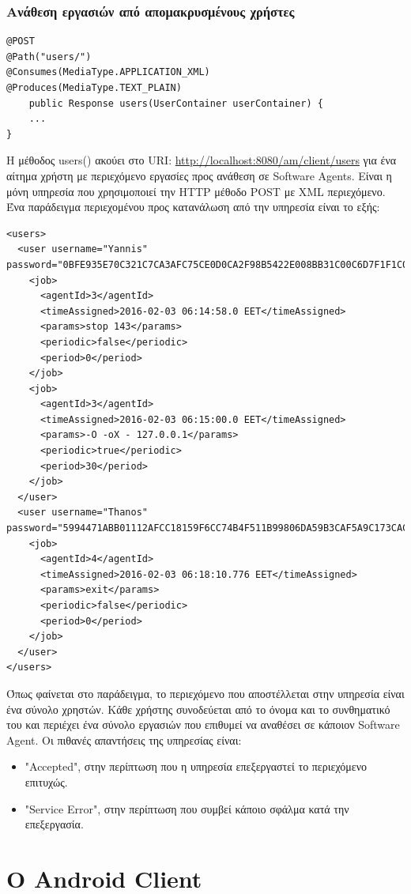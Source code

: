 \documentclass[a4paper,11pt]{article}
\begin{document}
\begin{sloppypar}
\subsubsection{Ανάθεση εργασιών από απομακρυσμένους χρήστες}
\begin{lstlisting}
@POST
@Path("users/")
@Consumes(MediaType.APPLICATION_XML)
@Produces(MediaType.TEXT_PLAIN)
    public Response users(UserContainer userContainer) {
    ...
}
\end{lstlisting}
Η μέθοδος users() ακούει στο URI: \url{http://localhost:8080/am/client/users} για ένα αίτημα χρήστη με περιεχόμενο εργασίες προς ανάθεση σε Software Agents. Είναι η μόνη υπηρεσία που χρησιμοποιεί την HTTP μέθοδο POST με XML περιεχόμενο.
Ένα παράδειγμα περιεχομένου προς κατανάλωση από την υπηρεσία είναι το εξής:
\begin{lstlisting}
<users>
  <user username="Yannis"
password="0BFE935E70C321C7CA3AFC75CE0D0CA2F98B5422E008BB31C00C6D7F1F1C0AD6">
    <job>
      <agentId>3</agentId>
      <timeAssigned>2016-02-03 06:14:58.0 EET</timeAssigned>
      <params>stop 143</params>
      <periodic>false</periodic>
      <period>0</period>
    </job>
    <job>
      <agentId>3</agentId>
      <timeAssigned>2016-02-03 06:15:00.0 EET</timeAssigned>
      <params>-O -oX - 127.0.0.1</params>
      <periodic>true</periodic>
      <period>30</period>
    </job>
  </user>
  <user username="Thanos"
password="5994471ABB01112AFCC18159F6CC74B4F511B99806DA59B3CAF5A9C173CACFC5">
    <job>
      <agentId>4</agentId>
      <timeAssigned>2016-02-03 06:18:10.776 EET</timeAssigned>
      <params>exit</params>
      <periodic>false</periodic>
      <period>0</period>
    </job>
  </user>
</users>
\end{lstlisting}

Όπως φαίνεται στο παράδειγμα, το περιεχόμενο που αποστέλλεται στην υπηρεσία είναι ένα σύνολο χρηστών. Κάθε χρήστης συνοδεύεται από το όνομα και το συνθηματικό του και περιέχει ένα σύνολο εργασιών που επιθυμεί να αναθέσει σε κάποιον Software Agent. Οι πιθανές απαντήσεις της υπηρεσίας είναι:
\begin{itemize}
\item "Accepted", στην περίπτωση που η υπηρεσία επεξεργαστεί το περιεχόμενο επιτυχώς.
\item "Service Error", στην περίπτωση που συμβεί κάποιο σφάλμα κατά την επεξεργασία.
\end{itemize}

\newpage

\section{Ο Android Client}


\end{sloppypar}
\end{document}
